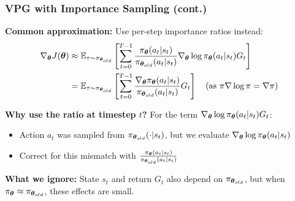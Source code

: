 \begin{frame}
    \frametitle{VPG with Importance Sampling (cont.)}
    \textbf{Common approximation:} Use per-step importance ratios instead:
    \begin{align*}
    \nabla_{\boldsymbol{\theta}} J({\boldsymbol{\theta}}) &\approx \mathbb{E}_{\tau \sim \pi_{{\boldsymbol{\theta}}_{old}}} 
        \left[ \sum_{t=0}^{T-1} \frac{\pi_{\boldsymbol{\theta}}(a_t|s_t)}{\pi_{{\boldsymbol{\theta}}_{old}}(a_t|s_t)} 
        \nabla_{\boldsymbol{\theta}} \log \pi_{\boldsymbol{\theta}}(a_t|s_t) G_t \right] \\
    &= \mathbb{E}_{\tau \sim \pi_{{\boldsymbol{\theta}}_{old}}} 
        \left[ \sum_{t=0}^{T-1} \frac{\nabla_{\boldsymbol{\theta}} \pi_{\boldsymbol{\theta}}(a_t|s_t)}{\pi_{{\boldsymbol{\theta}}_{old}}(a_t|s_t)} G_t \right]
        \quad \text{(as $\pi \nabla \log \pi = \nabla \pi$)}
    \end{align*}
    
    \textbf{Why use the ratio at timestep $t$?} For the term $\nabla_{\boldsymbol{\theta}} \log \pi_{\boldsymbol{\theta}}(a_t|s_t) G_t$:
    \begin{itemize}
        \item Action $a_t$ was sampled from $\pi_{{\boldsymbol{\theta}}_{old}}(\cdot|s_t)$, but we evaluate $\nabla_{\boldsymbol{\theta}} \log \pi_{\boldsymbol{\theta}}(a_t|s_t)$
        \item Correct for this mismatch with $\frac{\pi_{\boldsymbol{\theta}}(a_t|s_t)}{\pi_{{\boldsymbol{\theta}}_{old}}(a_t|s_t)}$
    \end{itemize}
    \textbf{What we ignore:} State $s_t$ and return $G_t$ also depend on $\pi_{{\boldsymbol{\theta}}_{old}}$, but when $\pi_{\boldsymbol{\theta}} \approx \pi_{{\boldsymbol{\theta}}_{old}}$, these effects are small.
\end{frame}




